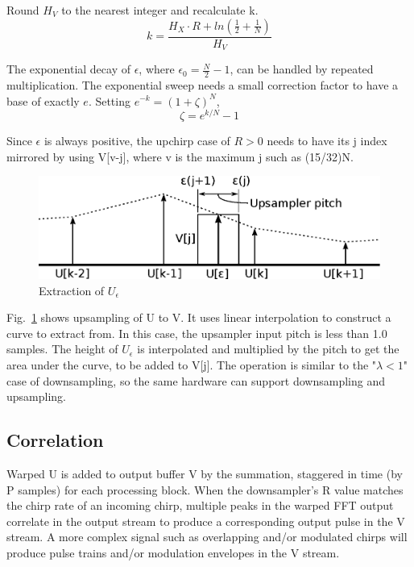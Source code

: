 Round $H_V$ to the nearest integer and recalculate k.
\begin{equation}
k = \frac{H_X \cdot R + ln\left(\frac{1}{2} + \frac{1}{N}\right)}{H_V}
\end{equation}

The exponential decay of $\epsilon$, where $\epsilon_0 = \frac{N}{2}-1$, can be
handled by repeated multiplication.
The exponential sweep needs a small correction factor to have a base of exactly
$e$.
Setting $e^{-k} = (1 + \zeta)^N$,
\begin{equation}
\zeta = e^{k/N} - 1
\end{equation}

Since $\epsilon$ is always positive, the upchirp case of $R>0$ needs to have its
j index mirrored by using V[v-j], where v is the maximum j such as (15/32)N.

\begin{figure}
	\centering
	\includegraphics[width=0.95\linewidth]{../source/uint_e}
	\caption[U interpolation]{Extraction of $U_\epsilon$}
	\label{fig:uint}
\end{figure}

Fig.~\ref{fig:uint} shows upsampling of U to V. It uses linear interpolation to
construct a curve to extract from.
In this case, the upsampler input pitch is less than 1.0 samples.
The height of $U_\epsilon$ is interpolated and multiplied by the pitch to get
the area under the curve, to be added to V[j].
The operation is similar to the "$\lambda < 1$" case of downsampling,
so the same hardware can support downsampling and upsampling.

\subsection{Correlation}

Warped U is added to output buffer V by the summation,
staggered in time (by P samples) for each processing block.
When the downsampler's R value matches the chirp rate of an incoming chirp,
multiple peaks in the warped FFT output correlate in the output stream to
produce a corresponding output pulse in the V stream.
A more complex signal such as overlapping and/or modulated chirps will produce
pulse trains and/or modulation envelopes in the V stream.

